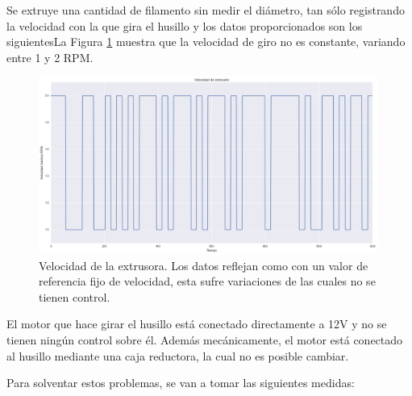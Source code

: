 Se extruye una cantidad de filamento sin medir el diámetro, tan sólo registrando la velocidad con la que gira el husillo y los datos proporcionados son los siguientesLa Figura \ref{fig:2007105-grafenc} muestra que la velocidad de giro no es constante, variando entre 1 y 2 RPM. 

\begin{figure}[H]
    \centering
    \includegraphics[width=0.99\textwidth]{images/producciones/20072015/RPM_tract.png}
    \caption[Velocidad de la extrusora]{Velocidad de la extrusora. Los datos reflejan como con un valor de referencia fijo de velocidad, esta sufre variaciones de las cuales no se tienen control.}
    \label{fig:2007105-grafenc}
\end{figure}

El motor que hace girar el husillo está conectado directamente a 12V y no se tienen ningún control sobre él. Además mecánicamente, el motor está conectado al husillo mediante una caja reductora, la cual no es posible cambiar.

Para solventar estos problemas, se van a tomar las siguientes medidas:

